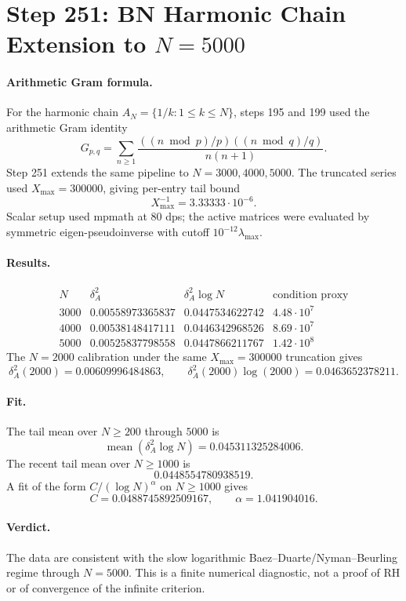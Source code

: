 \section*{Step 251: BN Harmonic Chain Extension to \(N=5000\)}

\paragraph{Arithmetic Gram formula.}
For the harmonic chain \(A_N=\{1/k:1\le k\le N\}\), steps 195 and 199 used
the arithmetic Gram identity
\[
G_{p,q}=
\sum_{n\ge 1}
\frac{((n\bmod p)/p)((n\bmod q)/q)}{n(n+1)}.
\]
Step 251 extends the same pipeline to \(N=3000,4000,5000\).  The truncated
series used \(X_{\max}=300000\), giving per-entry tail bound
\[
X_{\max}^{-1}=3.33333\cdot 10^{-6}.
\]
Scalar setup used mpmath at 80 dps; the active matrices were evaluated by
symmetric eigen-pseudoinverse with cutoff \(10^{-12}\lambda_{\max}\).

\paragraph{Results.}
\[
\begin{array}{c|c|c|c}
N & \delta_A^2 & \delta_A^2\log N & \text{condition proxy}\\
\hline
3000 & 0.00558973365837 & 0.0447534622742 & 4.48\cdot10^7\\
4000 & 0.00538148417111 & 0.0446342968526 & 8.69\cdot10^7\\
5000 & 0.00525837798558 & 0.0447866211767 & 1.42\cdot10^8
\end{array}
\]
The \(N=2000\) calibration under the same \(X_{\max}=300000\) truncation gives
\[
\delta_A^2(2000)=0.00609996484863,\qquad
\delta_A^2(2000)\log(2000)=0.0463652378211.
\]

\paragraph{Fit.}
The tail mean over \(N\ge 200\) through \(5000\) is
\[
\operatorname{mean}(\delta_A^2\log N)=0.045311325284006.
\]
The recent tail mean over \(N\ge1000\) is
\[
0.0448554780938519.
\]
A fit of the form \(C/(\log N)^\alpha\) on \(N\ge1000\) gives
\[
C=0.0488745892509167,\qquad \alpha=1.041904016.
\]

\paragraph{Verdict.}
The data are consistent with the slow logarithmic Baez--Duarte/Nyman--Beurling
regime through \(N=5000\).  This is a finite numerical diagnostic, not a proof
of RH or of convergence of the infinite criterion.
